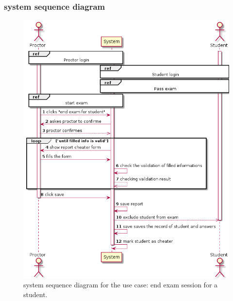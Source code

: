 \documentclass[]{uc2pfecaneva}
\begin{document}
\clearpage

\subsubsection{system sequence diagram}
\begin{figure}[h]
	
	\centering
	\includegraphics[width=\textwidth]{images/End_exam_for_student}
	
	\caption{system sequence diagram for the use case: end exam session for a student.}
\end{figure}
\clearpage
\end{document}

